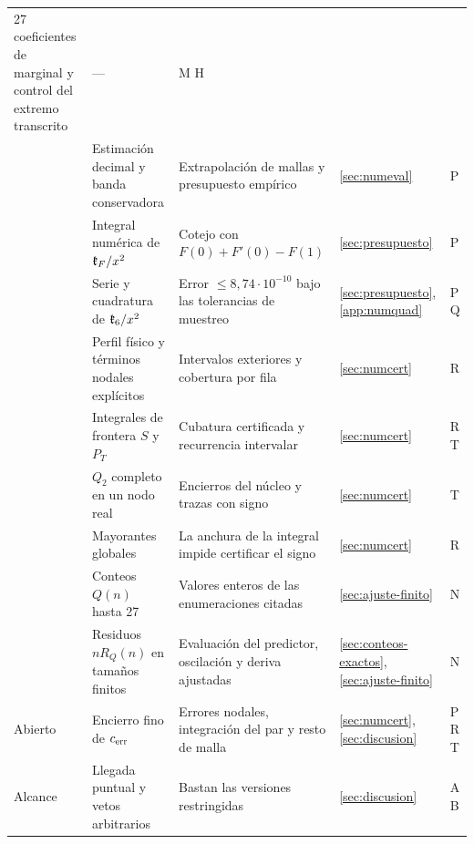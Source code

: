 {\begin{longtable}{@{}L{.09\linewidth}L{.25\linewidth}L{.33\linewidth}L{.13\linewidth}L{.08\linewidth}@{}}
 27 coeficientes de marginal y control del extremo transcrito &
 --- & M H \\
 & Estimación decimal y banda conservadora &
 Extrapolación de mallas y presupuesto empírico &
 \ref{sec:numeval} & P \\
 & Integral numérica de $\mathfrak{k}_F/x^2$ &
 Cotejo con $F(0)+F'(0)-F(1)$ &
 \ref{sec:presupuesto} & P \\
 & Serie y cuadratura de $\mathfrak{k}_6/x^2$ &
 Error $\le8{,}74\cdot10^{-10}$ bajo las tolerancias de muestreo &
 \ref{sec:presupuesto}, \ref{app:numquad} & P Q \\
 & Perfil físico y términos nodales explícitos &
 Intervalos exteriores y cobertura por fila &
 \ref{sec:numcert} & R \\
 & Integrales de frontera $S$ y $P_T$ &
 Cubatura certificada y recurrencia intervalar &
 \ref{sec:numcert} & R T \\
 & $Q_2$ completo en un nodo real &
 Encierros del núcleo y trazas con signo &
 \ref{sec:numcert} & T \\
 & Mayorantes globales &
 La anchura de la integral impide certificar el signo &
 \ref{sec:numcert} & R \\
 & Conteos $Q(n)$ hasta 27 &
 Valores enteros de las enumeraciones citadas &
 \ref{sec:ajuste-finito} & N \\
 & Residuos $nR_Q(n)$ en tamaños finitos &
 Evaluación del predictor, oscilación y deriva ajustadas &
 \ref{sec:conteos-exactos}, \ref{sec:ajuste-finito} & N \\
Abierto & Encierro fino de $c_{\mathrm{err}}$ &
 Errores nodales, integración del par y resto de malla &
 \ref{sec:numcert}, \ref{sec:discusion} & P R T \\
Alcance & Llegada puntual y vetos arbitrarios &
 Bastan las versiones restringidas &
 \ref{sec:discusion} & A B \\
\bottomrule
\end{longtable}
}

